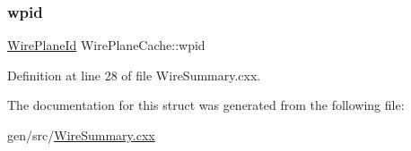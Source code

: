 \subsubsection{\texorpdfstring{wpid}{wpid}}
{\footnotesize\ttfamily \hyperlink{class_wire_cell_1_1_wire_plane_id}{Wire\+Plane\+Id} Wire\+Plane\+Cache\+::wpid}



Definition at line 28 of file Wire\+Summary.\+cxx.



The documentation for this struct was generated from the following file\+:\begin{DoxyCompactItemize}
\item 
gen/src/\hyperlink{_wire_summary_8cxx}{Wire\+Summary.\+cxx}\end{DoxyCompactItemize}
